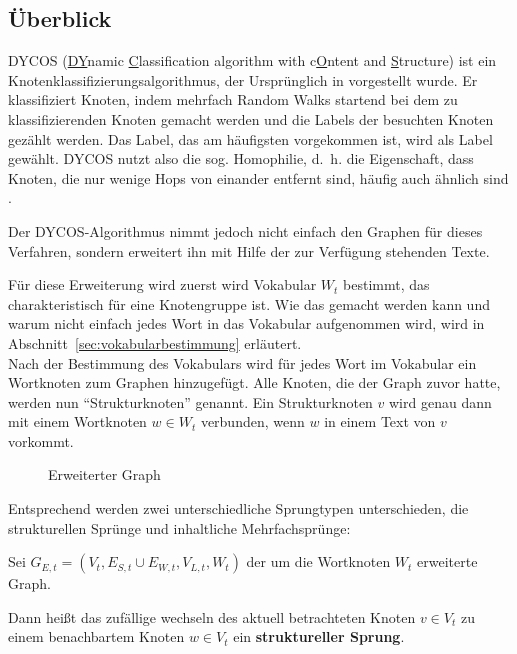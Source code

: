 \subsection{Überblick}
DYCOS (\underline{DY}namic \underline{C}lassification 
algorithm with c\underline{O}ntent and \underline{S}tructure) ist ein 
Knotenklassifizierungsalgorithmus, der Ursprünglich in \cite{aggarwal2011} vorgestellt 
wurde. Er klassifiziert Knoten, indem mehrfach Random Walks startend
bei dem zu klassifizierenden Knoten gemacht werden und die Labels
der besuchten Knoten gezählt werden. Das Label, das am häufigsten
vorgekommen ist, wird als Label gewählt.
DYCOS nutzt also die sog. Homophilie, d.~h. die Eigenschaft, dass
Knoten, die nur wenige Hops von einander entfernt sind, häufig auch
ähnlich sind \cite{bhagat}.

Der DYCOS-Algorithmus nimmt jedoch nicht einfach den Graphen für 
dieses Verfahren, sondern erweitert ihn mit Hilfe der zur Verfügung
stehenden Texte.

Für diese Erweiterung wird zuerst wird Vokabular $W_t$ bestimmt, das 
charakteristisch für eine Knotengruppe ist. Wie das gemacht werden kann
und warum nicht einfach jedes Wort in das Vokabular aufgenommen wird,
wird in Abschnitt~\ref{sec:vokabularbestimmung} erläutert.\\
Nach der Bestimmung des Vokabulars wird für 
jedes Wort im Vokabular ein Wortknoten zum Graphen hinzugefügt. Alle
Knoten, die der Graph zuvor hatte, werden nun \enquote{Strukturknoten}
genannt.
Ein Strukturknoten $v$ wird genau dann mit einem Wortknoten $w \in W_t$
verbunden, wenn $w$ in einem Text von $v$ vorkommt.

\begin{figure}[htp]
    \centering
    
    \caption{Erweiterter Graph}
    \label{fig:erweiterter-graph}
\end{figure}

Entsprechend werden zwei unterschiedliche Sprungtypen unterschieden,
die strukturellen Sprünge und inhaltliche Mehrfachsprünge:

\begin{definition}
    Sei $G_{E,t} = (V_t, E_{S,t} \cup E_{W,t}, V_{L,t}, W_{t})$ der
    um die Wortknoten $W_{t}$ erweiterte Graph.

    Dann heißt das zufällige wechseln des aktuell betrachteten
    Knoten $v \in V_t$ zu einem benachbartem Knoten $w \in V_t$
    ein \textbf{struktureller Sprung}.
\end{definition}

